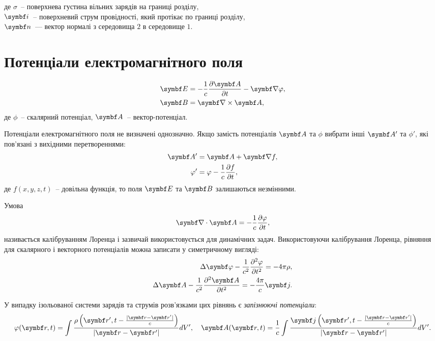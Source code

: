 \noindent%
де $\sigma$~-- поверхнева густина вільних зарядів на границі розділу,\\
$\vect{i}$~-- поверхневий струм провідності, який протікає по границі розділу, \\
$\vect{n}$~--- вектор нормалі з середовища $2$  в середовище $1$.

\section{Потенціали електромагнітного поля}

\begin{align}
	\Efield & = -\frac{1}{c}\frac{\partial \vect{A}}{\partial t} - \vect{\nabla}\phi, \label{E=phi+A} \\
	\Bfield & = \rot\vect{A},
\end{align}
де $\phi$~-- скалярний потенціал, $ \vect{A} $~-- вектор-потенціал.

Потенціали електромагнітного поля не визначені однозначно. Якщо замість потенціалів $\vect{A}$ та $\phi$ вибрати інші $\vect{A}'$ та $\phi'$, які пов'язані з вихідними перетвореннями:
\begin{align}
	\vect{A}' & = \vect{A} +\vect{\nabla}f,                     \\
	\phi'     & = \phi - \frac1c \frac{\partial f}{\partial t},
\end{align}
де  $f(x,y,z,t)$~-- довільна функція, то поля $\Efield$ та $\Bfield$ залишаються незмінними.

Умова
\begin{equation}\label{Lorentz_gauge}
	\vect\nabla\cdot\vect{A} = - \frac{1}{c}\frac{\partial\phi}{\partial t},
\end{equation}
називається калібруванням Лоренца і зазвичай використовується для динамічних задач.
Використовуючи калібрування Лоренца, рівняння для скалярного і векторного потенціалів можна записати у симетричному вигляді:
\begin{align}\label{Maxwell_equations_via_potantials}
	\Delta \vect{\phi} - \frac{1}{c^2} \frac{\partial^2 \phi}{\partial t^2} = -4\pi\rho, \\
	\Delta \vect{A} - \frac{1}{c^2} \frac{\partial^2 \vect{A}}{\partial t^2} = - \frac{4\pi}{c}\vect{j}.
\end{align}

У випадку ізольованої системи зарядів та струмів розв'язками цих рівнянь є \emph{запізнюючі потенціали}:
\begin{equation}\label{Retarded_potentials}
	\phi(\vect{r} , t) = \int\limits_{}\frac{\rho\left( \vect{r}', t - \frac{|\vect{r} - \vect{r}'|}{c}\right) }{|\vect{r} - \vect{r}'|}dV', \quad
	\vect{A}(\vect{r} , t) = \frac1c\int\limits_{}\frac{\vect{j}\left( \vect{r}', t - \frac{|\vect{r} - \vect{r}'|}{c}\right) }{|\vect{r} - \vect{r}'|}dV'.
\end{equation}

